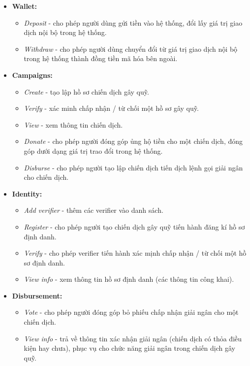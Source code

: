 \documentclass[../main-report.tex]{subfiles}
\begin{document}
\begin{itemize}
\item \textbf{Wallet:}
\begin{itemize}
\item \textit{Deposit} - cho phép người dùng gửi tiền vào hệ thống, đổi lấy giá trị giao dịch nội bộ trong hệ thống.
\item \textit{Withdraw} - cho phép người dùng chuyển đổi từ giá trị giao dịch nội bộ trong hệ thống thành đồng tiền mã hóa bên ngoài.
\end{itemize}
\item \textbf{Campaigns:}
\begin{itemize}
\item \textit{Create} - tạo lập hồ sơ chiến dịch gây quỹ.
\item \textit{Verify} - xác minh chấp nhận / từ chối một hồ sơ gây quỹ.
\item \textit{View} - xem thông tin chiến dịch.
\item \textit{Donate} - cho phép người đóng góp ủng hộ tiền cho một chiến dịch, đóng góp dưới dạng giá trị trao đổi trong hệ thống.
\item \textit{Disburse} - cho phép người tạo lập chiến dịch tiến dịch lệnh gọi giải ngân cho chiến dịch.
\end{itemize}
\item \textbf{Identity:}
\begin{itemize}
\item \textit{Add verifier} - thêm các verifier vào danh sách.
\item \textit{Register} - cho phép người tạo chiến dịch gây quỹ tiến hành đăng kí hồ sơ định danh.
\item \textit{Verify} - cho phép verifier tiến hành xác mịnh chấp nhận / từ chối một hồ sơ định danh.
\item \textit{View info} - xem thông tin hồ sơ định danh (các thông tin công khai). 
\end{itemize}
\item \textbf{Disbursement:}
\begin{itemize}
\item \textit{Vote} - cho phép người đóng góp bỏ phiếu chấp nhận giải ngân cho một chiến dịch.
\item \textit{View info} - trả về thông tin xác nhận giải ngân (chiến dịch có thỏa điều kiện hay chưa), phục vụ cho chức năng giải ngân trong chiến dịch gây quỹ.
\end{itemize}
\end{itemize}
\end{document}
